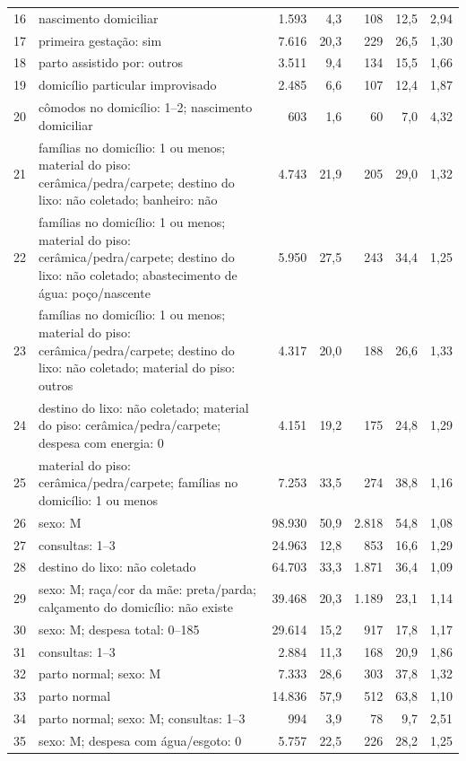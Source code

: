 \begin{table}[H]
\begin{tabularx}{\textwidth}{@{}c Y r r r r r@{}}
16 & nascimento domiciliar & 1.593 & 4,3 & 108 & 12,5 & 2,94 \\
17 & primeira gestação: sim & 7.616 & 20,3 & 229 & 26,5 & 1,30 \\
18 & parto assistido por: outros & 3.511 & 9,4 & 134 & 15,5 & 1,66 \\
19 & domicílio particular improvisado & 2.485 & 6,6 & 107 & 12,4 & 1,87 \\
20 & cômodos no domicílio: 1--2; nascimento domiciliar & 603 & 1,6 & 60 & 7,0 & 4,32 \\

21 & famílias no domicílio: 1 ou menos; material do piso: cerâmica/pedra/carpete; destino do lixo: não coletado; banheiro: não & 4.743 & 21,9 & 205 & 29,0 & 1,32 \\
22 & famílias no domicílio: 1 ou menos; material do piso: cerâmica/pedra/carpete; destino do lixo: não coletado; abastecimento de água: poço/nascente & 5.950 & 27,5 & 243 & 34,4 & 1,25 \\
23 & famílias no domicílio: 1 ou menos; material do piso: cerâmica/pedra/carpete; destino do lixo: não coletado; material do piso: outros & 4.317 & 20,0 & 188 & 26,6 & 1,33 \\
24 & destino do lixo: não coletado; material do piso: cerâmica/pedra/carpete; despesa com energia: 0 & 4.151 & 19,2 & 175 & 24,8 & 1,29 \\
25 & material do piso: cerâmica/pedra/carpete; famílias no domicílio: 1 ou menos & 7.253 & 33,5 & 274 & 38,8 & 1,16 \\

26 & sexo: M & 98.930 & 50,9 & 2.818 & 54,8 & 1,08 \\
27 & consultas: 1--3 & 24.963 & 12,8 & 853 & 16,6 & 1,29 \\
28 & destino do lixo: não coletado & 64.703 & 33,3 & 1.871 & 36,4 & 1,09 \\
29 & sexo: M; raça/cor da mãe: preta/parda; calçamento do domicílio: não existe & 39.468 & 20,3 & 1.189 & 23,1 & 1,14 \\
30 & sexo: M; despesa total: 0--185 & 29.614 & 15,2 & 917 & 17,8 & 1,17 \\

31 & consultas: 1--3 & 2.884 & 11,3 & 168 & 20,9 & 1,86 \\
32 & parto normal; sexo: M & 7.333 & 28,6 & 303 & 37,8 & 1,32 \\
33 & parto normal & 14.836 & 57,9 & 512 & 63,8 & 1,10 \\
34 & parto normal; sexo: M; consultas: 1--3 & 994 & 3,9 & 78 & 9,7 & 2,51 \\
35 & sexo: M; despesa com água/esgoto: 0 & 5.757 & 22,5 & 226 & 28,2 & 1,25 \\


\end{tabularx}
\end{table}
